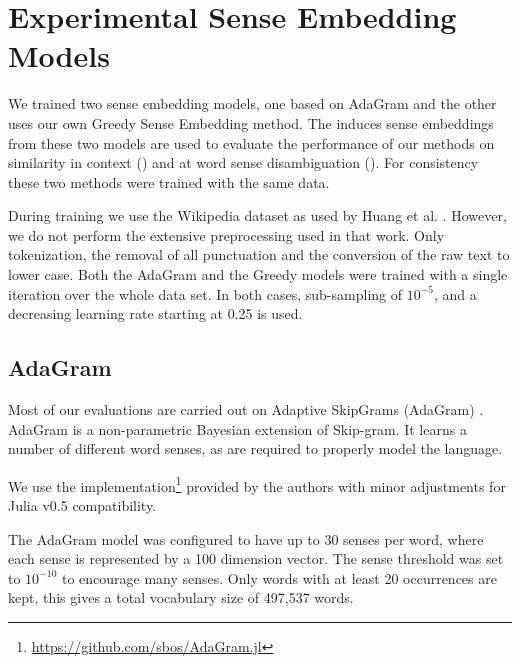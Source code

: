 \documentclass{article}
\def\parencite{\cite}
\begin{document}
\section{Experimental Sense Embedding Models} 
\label{Models}
We trained two sense embedding models, one based on AdaGram \parencite{AdaGrams} 
and the other uses our own Greedy Sense Embedding method. 
The induces sense embeddings from these two models are used to evaluate the performance of our methods on similarity in context () and at word sense disambiguation ().
For consistency these two methods were trained with the same data.

During training we use the Wikipedia dataset as used by Huang et al. \parencite{Huang2012}.
However, we do not perform the extensive preprocessing used in that work.
Only tokenization, the removal of all punctuation and the conversion of the raw text to lower case.
Both the AdaGram and the Greedy models were trained with a single iteration over the whole data set.
In both cases, sub-sampling of $10^{-5}$, and a decreasing learning rate starting at 0.25 is used.

\subsection{AdaGram}
Most of our evaluations are carried out on Adaptive SkipGrams (AdaGram) \parencite{AdaGrams}.
AdaGram is a non-parametric Bayesian extension of Skip-gram. It learns a number of different word senses, as are required to properly model the language.

We use the implementation\footnote{\url{https://github.com/sbos/AdaGram.jl}} provided by the authors with minor adjustments for Julia \parencite{Julia} v0.5 compatibility.


The AdaGram model was configured to have up to 30 senses per word, where each sense is represented by a 100 dimension vector. 
The sense threshold was set to $10^{-10}$ to encourage many senses.
Only words with at least 20 occurrences are kept, this gives a total vocabulary size of 497,537 words.


\end{document}
